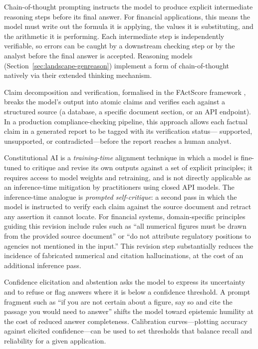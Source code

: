 \begin{context}
Chain-of-thought prompting \citep{wei2022chain} instructs the model to produce explicit
intermediate reasoning steps before its final answer.  For financial applications, this
means the model must write out the formula it is applying, the values it is substituting,
and the arithmetic it is performing.  Each intermediate step is independently
verifiable, so errors can be caught by a downstream checking step or by the analyst
before the final answer is accepted.  Reasoning models (Section~\ref{sec:landscape-genreason})
implement a form of chain-of-thought natively via their extended thinking mechanism.

Claim decomposition and verification, formalised in the FActScore framework
\citep{min2023factscore}, breaks the model's output into atomic claims and verifies
each against a structured source (a database, a specific document section, or an
API endpoint).  In a production compliance-checking pipeline, this approach allows
each factual claim in a generated report to be tagged with its verification status---
supported, unsupported, or contradicted---before the report reaches a human analyst.

Constitutional AI \citep{bai2022constitutional} is a \emph{training-time} alignment
technique in which a model is fine-tuned to critique and revise its own outputs
against a set of explicit principles; it requires access to model weights and
retraining, and is not directly applicable as an inference-time mitigation by
practitioners using closed API models.  The inference-time analogue is
\emph{prompted self-critique}: a second pass in which the model is instructed to
verify each claim against the source document and retract any assertion it cannot
locate.  For financial systems, domain-specific principles guiding this revision
include rules such as ``all numerical figures must be drawn from the provided source
document'' or ``do not attribute regulatory positions to agencies not mentioned in
the input.''  This revision step substantially reduces the incidence of fabricated
numerical and citation hallucinations, at the cost of an additional inference pass.

Confidence elicitation and abstention asks the model to express its uncertainty and
to refuse or flag answers where it is below a confidence threshold.  A prompt fragment
such as ``if you are not certain about a figure, say so and cite the passage you would
need to answer'' shifts the model toward epistemic humility at the cost of reduced
answer completeness.  Calibration curves---plotting accuracy against elicited
confidence---can be used to set thresholds that balance recall and reliability for a
given application.


\end{context}
